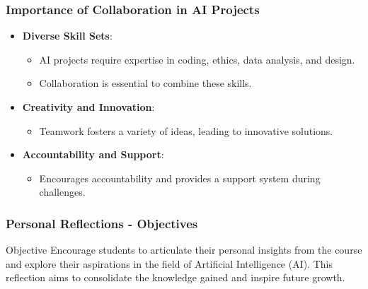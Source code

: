 \documentclass[aspectratio=169]{beamer}
\begin{document}
\begin{frame}[fragile]
    \frametitle{Importance of Collaboration in AI Projects}
    \begin{itemize}
        \item \textbf{Diverse Skill Sets}:
        \begin{itemize}
            \item AI projects require expertise in coding, ethics, data analysis, and design.
            \item Collaboration is essential to combine these skills.
        \end{itemize}

        \item \textbf{Creativity and Innovation}:
        \begin{itemize}
            \item Teamwork fosters a variety of ideas, leading to innovative solutions.
        \end{itemize}

        \item \textbf{Accountability and Support}:
        \begin{itemize}
            \item Encourages accountability and provides a support system during challenges.
        \end{itemize}
    \end{itemize}
\end{frame}

\begin{frame}[fragile]
    \frametitle{Personal Reflections - Objectives}
    \begin{block}{Objective}
        Encourage students to articulate their personal insights from the course and explore their aspirations in the field of Artificial Intelligence (AI). This reflection aims to consolidate the knowledge gained and inspire future growth.
    \end{block}
\end{frame}
\end{document}
